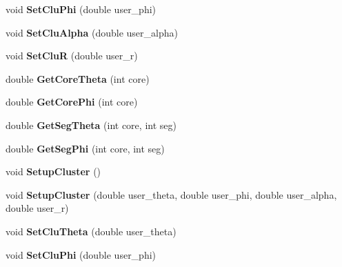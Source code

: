 \begin{DoxyCompactItemize}
\mbox{\label{class_m_b_geometry_a74142f84cf6317d52ae39c0e0ff8a87e}} 
void {\bfseries Set\+Clu\+Phi} (double user\+\_\+phi)
\item 
\mbox{\label{class_m_b_geometry_a0d4868b0360a6e5534918a9813540015}} 
void {\bfseries Set\+Clu\+Alpha} (double user\+\_\+alpha)
\item 
\mbox{\label{class_m_b_geometry_a292c4326421c78871667e91c3694ae35}} 
void {\bfseries Set\+CluR} (double user\+\_\+r)
\item 
\mbox{\label{class_m_b_geometry_a42aa536f15017724812712b0f8a77c12}} 
double {\bfseries Get\+Core\+Theta} (int core)
\item 
\mbox{\label{class_m_b_geometry_a39f685610ae0e68e547a46f8ef992599}} 
double {\bfseries Get\+Core\+Phi} (int core)
\item 
\mbox{\label{class_m_b_geometry_a49cdf742a2902fc85f0b24dfffa554a8}} 
double {\bfseries Get\+Seg\+Theta} (int core, int seg)
\item 
\mbox{\label{class_m_b_geometry_a575ddd6022d2d686a83ebce3195b6c50}} 
double {\bfseries Get\+Seg\+Phi} (int core, int seg)
\item 
\mbox{\label{class_m_b_geometry_a4d98a38f0dc1ca6a4a73477dde5cdd8d}} 
void {\bfseries Setup\+Cluster} ()
\item 
\mbox{\label{class_m_b_geometry_a93f157cebad3f63dbbefb5b08f3555af}} 
void {\bfseries Setup\+Cluster} (double user\+\_\+theta, double user\+\_\+phi, double user\+\_\+alpha, double user\+\_\+r)
\item 
\mbox{\label{class_m_b_geometry_a9a2a8c9609141be92d7ba30e6087aa30}} 
void {\bfseries Set\+Clu\+Theta} (double user\+\_\+theta)
\item 
\mbox{\label{class_m_b_geometry_a74142f84cf6317d52ae39c0e0ff8a87e}} 
void {\bfseries Set\+Clu\+Phi} (double user\+\_\+phi)
\item 

\end{DoxyCompactItemize}

